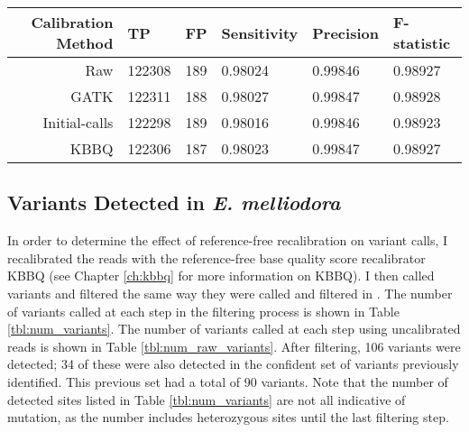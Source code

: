 \begin{table}
\centering
\begin{tabular}{r l l l l l}
\toprule
Calibration Method & TP & FP & Sensitivity & Precision & F-statistic \\
\midrule
Raw & 122308 & 189 & 0.98024 & 0.99846 & 0.98927\\ 
GATK & 122311 & 188 & 0.98027 & 0.99847 & 0.98928\\ 
Initial-calls & 122298 & 189 & 0.98016 & 0.99846 & 0.98923\\ 
KBBQ & 122306 & 187 & 0.98023 & 0.99847 & 0.98927\\ 
\bottomrule
\end{tabular}
\label{table:sim_summary}
\end{table}



\subsection{Variants Detected in \textit{E. melliodora}}

In order to determine the effect of reference-free recalibration on variant calls, I recalibrated the reads with the reference-free base quality score recalibrator KBBQ (see Chapter \ref{ch:kbbq} for more information on KBBQ). I then called variants and filtered the same way they were called and filtered in \textcite{orr_phylogenomic_2020}. The number of variants called at each step in the filtering process is shown in Table \ref{tbl:num_variants}. The number of variants called at each step using uncalibrated reads is shown in Table \ref{tbl:num_raw_variants}. After filtering, 106 variants were detected; 34 of these were also detected in the confident set of variants previously identified. This previous set had a total of 90 variants. Note that the number of detected sites listed in Table \ref{tbl:num_variants} are not all indicative of mutation, as the number includes heterozygous sites until the last filtering step.

